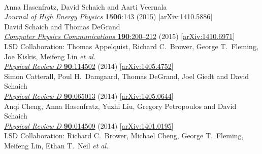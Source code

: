 \begin{spacelist}
\begin{revnumerate}
    \pagebreakitem
       \\
      Anna Hasenfratz, David Schaich and Aarti Veernala \\
      \href{http://dx.doi.org/10.1007/JHEP06(2015)143}{\textit{Journal of High Energy Physics} \textbf{1506}:143} (2015) [\href{http://arxiv.org/abs/1410.5886}{arXiv:1410.5886}]
    \pagebreakitem
       \\
      David Schaich and Thomas DeGrand \\
      \href{http://dx.doi.org/10.1016/j.cpc.2014.12.025}{\textit{Computer Physics Communications} \textbf{190}:200--212} (2015) [\href{http://arxiv.org/abs/1410.6971}{arXiv:1410.6971}]
    \pagebreakitem
       \\
      LSD Collaboration: Thomas Appelquist, Richard C.~Brower, George T.~Fleming, Joe Kiskis, Meifeng Lin \textit{et al.} \\ %
      \href{http://dx.doi.org/10.1103/PhysRevD.90.114502}{\textit{Physical Review D} \textbf{90}:114502} (2014) [\href{http://arxiv.org/abs/1405.4752}{arXiv:1405.4752}]
    \pagebreakitem
       \\
      Simon Catterall, Poul H.~Damgaard, Thomas DeGrand, Joel Giedt and David Schaich \\
      \href{http://dx.doi.org/10.1103/PhysRevD.90.065013}{\textit{Physical Review D} \textbf{90}:065013} (2014) [\href{http://arxiv.org/abs/1405.0644}{arXiv:1405.0644}]
    \pagebreakitem
       \\
      Anqi Cheng, Anna Hasenfratz, Yuzhi Liu, Gregory Petropoulos and David Schaich \\
      \href{http://dx.doi.org/10.1103/PhysRevD.90.014509}{\textit{Physical Review D} \textbf{90}:014509} (2014) [\href{http://arxiv.org/abs/1401.0195}{arXiv:1401.0195}]
    \pagebreakitem
       \\
      LSD Collaboration: Richard C.~Brower, Michael Cheng, George T.~Fleming, Meifeng Lin, Ethan T.~Neil \textit{et al.} \\ %

\end{revnumerate}
\end{spacelist}
